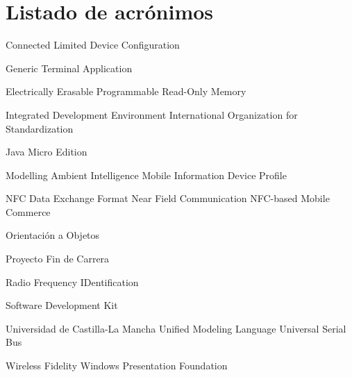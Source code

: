 
\chapter{Listado de acrónimos}

{\small
\begin{acronym}[XXXXXXXX]
      {Connected Limited Device Configuration}

       {Generic Terminal Application}

       {Electrically Erasable Programmable Read-Only Memory}

       {Integrated Development Environment}
       {International Organization for Standardization}

    {Java Micro Edition}

      {Modelling Ambient Intelligence}
      {Mobile Information Device Profile}

      {NFC Data Exchange Format}
       {Near Field Communication}
       {NFC-based Mobile Commerce}

        {Orientación a Objetos}

       {Proyecto Fin de Carrera}

      {Radio Frequency IDentification}

       {Software Development Kit}

      {Universidad de Castilla-La Mancha}
       {Unified Modeling Language}
       {Universal Serial Bus}

      {Wireless Fidelity}
       {Windows Presentation Foundation}
\end{acronym}
}




